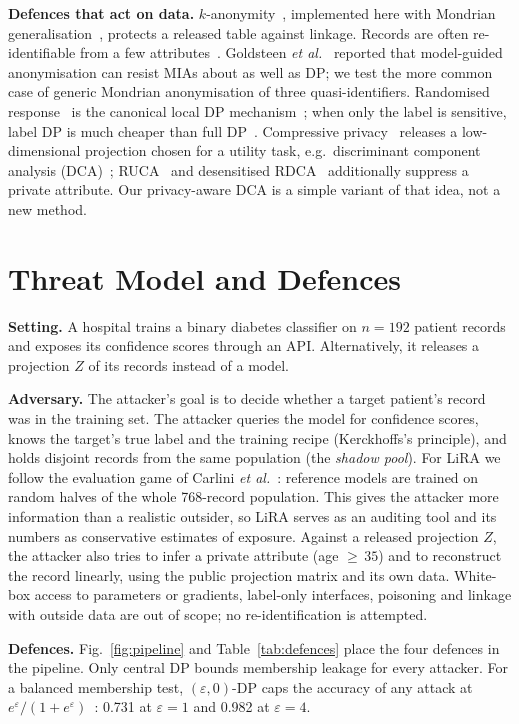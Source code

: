 \documentclass[conference]{IEEEtran}
\newcommand{\eps}{\varepsilon}
\begin{document}
\textbf{Defences that act on data.} $k$-anonymity~\cite{sweeney2002}, implemented here with Mondrian generalisation~\cite{lefevre2006}, protects a released table against linkage. Records are often re-identifiable from a few attributes~\cite{rocher2019}. Goldsteen \emph{et al.}~\cite{goldsteen2021} reported that model-guided anonymisation can resist MIAs about as well as DP; we test the more common case of generic Mondrian anonymisation of three quasi-identifiers. Randomised response~\cite{warner1965} is the canonical local DP mechanism~\cite{kasiviswanathan2011}; when only the label is sensitive, label DP is much cheaper than full DP~\cite{ghazi2021}. Compressive privacy~\cite{kung2017spm} releases a low-dimensional projection chosen for a utility task, e.g.\ discriminant component analysis (DCA)~\cite{kung2017dca}; RUCA~\cite{al2017ruca} and desensitised RDCA~\cite{filipowicz2017} additionally suppress a private attribute. Our privacy-aware DCA is a simple variant of that idea, not a new method.

\section{Threat Model and Defences}
\textbf{Setting.} A hospital trains a binary diabetes classifier on $n{=}192$ patient records and exposes its confidence scores through an API. Alternatively, it releases a projection $Z$ of its records instead of a model.

\textbf{Adversary.} The attacker's goal is to decide whether a target patient's record was in the training set. The attacker queries the model for confidence scores, knows the target's true label and the training recipe (Kerckhoffs's principle), and holds disjoint records from the same population (the \emph{shadow pool}). For LiRA we follow the evaluation game of Carlini \emph{et al.}~\cite{carlini2022}: reference models are trained on random halves of the whole 768-record population. This gives the attacker more information than a realistic outsider, so LiRA serves as an auditing tool and its numbers as conservative estimates of exposure. Against a released projection $Z$, the attacker also tries to infer a private attribute (age ${\geq}\,35$) and to reconstruct the record linearly, using the public projection matrix and its own data. White-box access to parameters or gradients, label-only interfaces, poisoning and linkage with outside data are out of scope; no re-identification is attempted.

\textbf{Defences.} Fig.~\ref{fig:pipeline} and Table~\ref{tab:defences} place the four defences in the pipeline. Only central DP bounds membership leakage for every attacker. For a balanced membership test, $(\eps,0)$-DP caps the accuracy of any attack at $e^{\eps}/(1+e^{\eps})$~\cite{kairouz2015}: 0.731 at $\eps{=}1$ and 0.982 at $\eps{=}4$.
\end{document}
